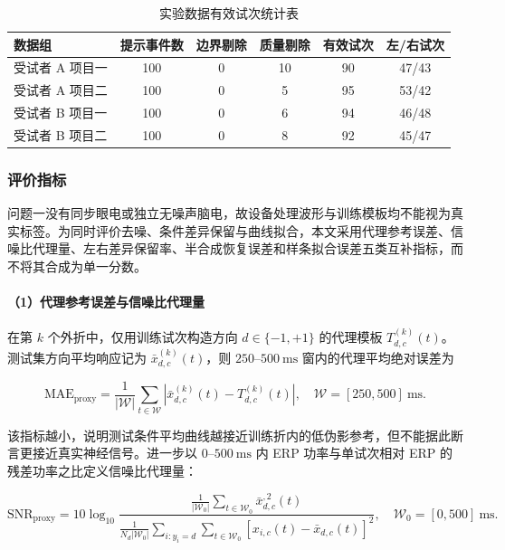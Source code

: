 \documentclass[a4paper,zihao=-4,linespread=1]{ctexart}
\numberwithin{figure}{section}       %
\begin{document}
\begin{table}[H]
    \centering
    \caption{实验数据有效试次统计表}
    \label{tab:q1_trial_audit}
    \begin{tabular}{lccccc}
        \toprule
        \textbf{数据组} & \textbf{提示事件数} & \textbf{边界剔除} & \textbf{质量剔除} & \textbf{有效试次} & \textbf{左/右试次} \\
        \midrule
        受试者 A 项目一 & 100 & 0 & 10 & 90 & 47/43 \\
        受试者 A 项目二 & 100 & 0 & 5  & 95 & 53/42 \\
        受试者 B 项目一 & 100 & 0 & 6  & 94 & 46/48 \\
        受试者 B 项目二 & 100 & 0 & 8  & 92 & 45/47 \\
        \bottomrule
    \end{tabular}
\end{table}

\subsubsection{评价指标}

问题一没有同步眼电或独立无噪声脑电，故设备处理波形与训练模板均不能视为真实标签。为同时评价去噪、条件差异保留与曲线拟合，本文采用代理参考误差、信噪比代理量、左右差异保留率、半合成恢复误差和样条拟合误差五类互补指标，而不将其合成为单一分数。

\paragraph{（1）代理参考误差与信噪比代理量}

在第 $k$ 个外折中，仅用训练试次构造方向 $d\in\{-1,+1\}$ 的代理模板 $T^{(k)}_{d,c}(t)$。测试集方向平均响应记为 $\bar{x}^{(k)}_{d,c}(t)$，则 $250$--$500~\mathrm{ms}$ 窗内的代理平均绝对误差为

\begin{equation}
    \mathrm{MAE}_{\mathrm{proxy}}=
    \frac{1}{|\mathcal{W}|}\sum_{t\in\mathcal{W}}
    \left|\bar{x}^{(k)}_{d,c}(t)-T^{(k)}_{d,c}(t)\right|,
    \quad \mathcal{W}=[250,500]~\mathrm{ms}.
    \label{eq:q1_mae}
\end{equation}

该指标越小，说明测试条件平均曲线越接近训练折内的低伪影参考，但不能据此断言更接近真实神经信号。进一步以 $0$--$500~\mathrm{ms}$ 内 ERP 功率与单试次相对 ERP 的残差功率之比定义信噪比代理量：

\begin{equation}
    \mathrm{SNR}_{\mathrm{proxy}}=10\log_{10}
    \frac{\frac{1}{|\mathcal{W}_0|}\sum_{t\in\mathcal{W}_0}\bar{x}_{d,c}^{,2}(t)}
    {\frac{1}{N_d|\mathcal{W}_0|}\sum_{i:y_i=d}\sum_{t\in\mathcal{W}_0}
    \left[x_{i,c}(t)-\bar{x}_{d,c}(t)\right]^2},
    \quad \mathcal{W}_0=[0,500]~\mathrm{ms}.
    \label{eq:q1_snr}
\end{equation}
\end{document}
